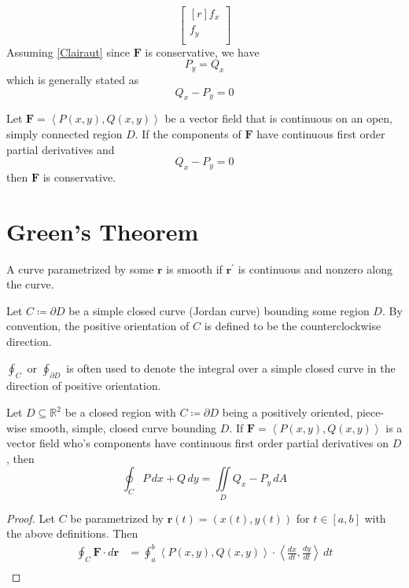 \begin{intuition}
\[\begin{bmatrix}[r]
         f_x \\
          f_y\\
    \end{bmatrix}
\]
Assuming \ref{Clairaut} since \(\mathbf{F}\) is conservative, we have 
\[
    P_y = Q_x
\]
which is generally stated as 
\[
    Q_x - P_y = 0
\]
\begin{theorem}\label{test}
    Let \(\mathbf{F} = \left\langle P(x,y),Q(x,y) \right\rangle \) be a vector field that is continuous on an open, simply connected region \(D\). If the components of \(\mathbf{F}\) have continuous first order partial derivatives and
    \[
        Q_x - P_y = 0
    \]
    then \(\mathbf{F}\) is conservative.
\end{theorem}
\section{Green's Theorem}
\begin{prev}
    A curve parametrized by some \(\mathbf{r}\) is smooth if \(\mathbf{r}^{\prime} \) is continuous and nonzero along the curve.
\end{prev}
\begin{definition}
    Let \(C\coloneqq \partial D\) be a simple closed curve (Jordan curve) bounding some region \(D\). By convention, the positive orientation of \(C\) is defined to be the counterclockwise direction.
\end{definition}
\begin{remark}
    \(\oint_C\) or \(\oint_{\partial D}\) is often used to denote the integral over a simple closed curve in the direction of positive orientation.
\end{remark}
\begin{theorem}\label{ftc:green}
    Let \(D\subseteq \mathbb{R}^2\) be a closed region with \(C\coloneqq \partial D\) being a positively oriented, piece-wise smooth, simple, closed curve bounding \(D\). If \(\mathbf{F}=\left\langle P(x,y),Q(x,y) \right\rangle \) is a vector field who's components have continuous first order partial derivatives on \(D\), then 
    \[
        \oint_C P\,dx + Q\,dy = \iint\limits_{D}Q_x - P_y\,dA
    \]
\end{theorem}
\begin{proof}
    Let \(C\) be parametrized by \(\mathbf{r}(t)=(x(t),y(t))\) for \(t\in[a,b]\) with the above definitions. Then 
    \begin{align*}
        \oint_C \mathbf{F}\cdot d \mathbf{r}&= \oint_a^b \left\langle P(x,y),Q(x,y) \right\rangle \cdot \left\langle \frac{d x}{d t} ,\frac{d y}{d t}  \right\rangle\,dt \\

\end{align*}
\end{proof}
\end{intuition}
